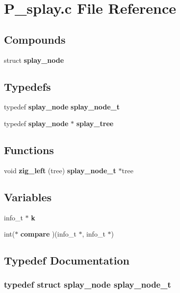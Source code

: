 \section{P\_\-splay.c File Reference}
\label{P__splay_8c}
\subsection*{Compounds}
\begin{CompactItemize}
\item 
struct {\bf splay\_\-node}
\end{CompactItemize}
\subsection*{Typedefs}
\begin{CompactItemize}
\item 
typedef {\bf splay\_\-node} {\bf splay\_\-node\_\-t}
\item 
typedef {\bf splay\_\-node} $\ast$ {\bf splay\_\-tree}
\end{CompactItemize}
\subsection*{Functions}
\begin{CompactItemize}
\item 
void {\bf zig\_\-left} (tree) {\bf splay\_\-node\_\-t} $\ast$tree
\end{CompactItemize}
\subsection*{Variables}
\begin{CompactItemize}
\item 
info\_\-t $\ast$ {\bf k}
\item 
int($\ast$ {\bf compare} )(info\_\-t $\ast$, info\_\-t $\ast$)
\end{CompactItemize}


\subsection{Typedef Documentation}
\subsubsection{\setlength{\rightskip}{0pt plus 5cm}typedef struct {\bf splay\_\-node} splay\_\-node\_\-t}\label{P__splay_8c_a0}


